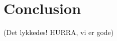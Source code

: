 \documentclass[Main]{subfiles}
\begin{document}
\section{Conclusion}

(Det lykkedes! HURRA, vi er gode)
\end{document}

